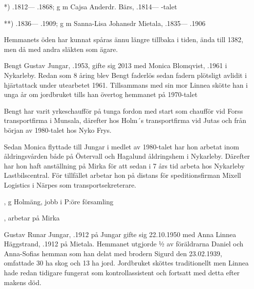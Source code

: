 *) .1812--- .1868; g m Cajsa Anderdr. Bärs, .1814--- -talet

**) .1836--- .1909; g m Sanna-Lisa Johansdr Mietala, .1835--- .1906

Hemmanets öden har kunnat spåras ännu längre tillbaka i tiden, ända till 1382, men då med andra släkten som ägare.






Bengt Gustav Jungar, .1953, gifte sig 2013 med Monica Blomqvist, .1961 i Nykarleby. Redan som 8 åring blev Bengt faderlös sedan fadern plötsligt avlidit i hjärtattack under utearbetet 1961. Tillsammans med sin mor Linnea skötte han i unga år om jordbruket tills han övertog hemmanet på 1970-talet

Bengt har varit yrkeschaufför på tunga fordon med start som chaufför vid Forss transportfirma i Munsala, därefter hos Holm´s transportfirma vid Jutas och från början av 1980-talet hos Nyko Frys.

Sedan Monica flyttade till Jungar i medlet av 1980-talet har hon arbetat inom åldringsvården både på Östervall och Hagalund åldringshem i Nykarleby. Därefter har hon haft anställning på Mirka för att sedan i 7 års tid arbeta hos Nykarleby Lastbilscentral. För tillfället arbetar hon på distans för speditionsfirman Mixell Logistics i Närpes som transportsekreterare.
\begin{jhchildren}
  \item {}, g Holmäng, jobb i P:öre församling
  \item {}, arbetar på Mirka
\end{jhchildren}


Gustav Runar Jungar, .1912 på Jungar gifte sig 22.10.1950 med Anna Linnea Häggstrand, .1912 på Mietala. Hemmanet utgjorde ½ av föräldrarna Daniel och Anna-Sofias hemman som han delat med brodern Sigurd den 23.02.1939, omfattade 30 ha skog och 13 ha jord. Jordbruket sköttes traditionellt men Linnea hade redan tidigare fungerat som kontrollassistent och fortsatt med detta efter makens död.

